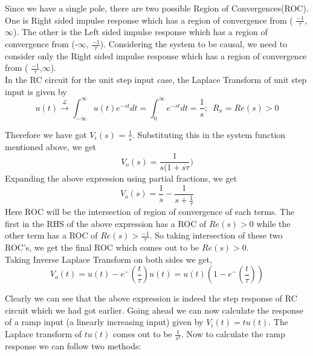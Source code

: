 \noindent
Since we have a single pole, there are two possible Region of Convergences(ROC). One is Right sided impulse response which has a region of convergence from ( $\frac{-1}{\tau}$,$\infty$). The other is the Left sided impulse response which has a region of convergence from (-$\infty$, $\frac{-1}{\tau}$). Considering the system to be causal, we need to consider only the Right sided impulse response which has a region of convergence from ( $\frac{-1}{\tau}$,$\infty$).\\

\noindent
In the RC circuit for the unit step input case, the Laplace Transform of unit step input is given by 
\[ u(t) \xrightarrow{\ \mathcal{L}\ } \int_{-\infty}^{\infty}{u(t)e^{-st}dt} = \int_{0}^{\infty}{e^{-st}dt} = \frac{1}{s} ; \enspace R_x = Re(s)>0 \]

\noindent
Therefore we have got $V_i(s)$ = $\frac{1}{s}$. Substituting this in the system function mentioned above, we get
\[  V_o(s) = \frac{1}{s(1+s\tau})\] 
\noindent
Expanding the above expression using partial fractions, we get\\
\[  V_o(s) = \frac{1}{s} - \frac{1}{s+\frac{1}{\tau}}\] 
\noindent
Here ROC will be the intersection of region of convergence of each terms. The first in the RHS of the above expression has a ROC of $Re(s) > 0$ while the other term has a ROC of $Re(s) > \frac{-1}{\tau}$. So taking intersection of these two ROC's, we get the final ROC which comes out to be $Re(s)>0$.\\

\noindent
Taking Inverse Laplace Transform on both sides we get,\\
\[  V_o(t) = u(t) - e^-(\frac{t}{\tau})u(t) = u(t)(1 - e^-(\frac{t}{\tau}))\]

\noindent
Clearly we can see that the above expression is indeed the step response of RC circuit which we had got earlier. Going ahead we can now calculate the response of a ramp input (a linearly increasing input) given by $V_i(t) = tu(t)$. The Laplace transform of $tu(t)$ comes out to be $\frac{1}{s^2}$. Now to calculate the ramp response we can follow two methods:\\

